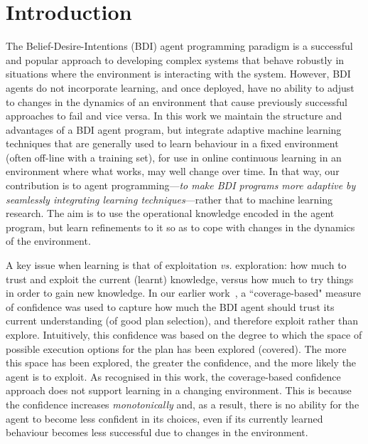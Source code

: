 \section{Introduction}\label{sec:introduction}


The Belief-Desire-Intentions (BDI) agent programming paradigm
\cite{WooldridgeBook,BusettaRHL:AL99-JACK,Pokahr:EXP03-JADEX,jasonbook} is a
successful and popular approach to developing complex systems that
behave robustly in situations where the environment is
interacting with the system.
However, BDI agents do not incorporate learning, and once deployed,
have no ability to adjust to changes in the dynamics of an environment
that cause previously successful approaches to fail and vice versa.
In this work we maintain the structure and advantages of a BDI agent
program, but integrate adaptive machine
learning techniques that are generally used to learn behaviour in a
fixed environment (often off-line with a training set),
for use in online continuous learning in an environment where what
works, may well change over time.
In that way, our contribution is to agent programming---\emph{to make BDI programs more adaptive by seamlessly integrating learning techniques}---rather that to machine learning research.
The aim is to use the operational knowledge encoded in the agent program, but learn refinements to it so as to cope with changes in the dynamics of the environment. 

A key issue when learning is that of exploitation \emph{vs.} exploration: how much to trust and exploit the current
(learnt) knowledge, versus how much to try things in order to gain new
knowledge. 
In our earlier work~\cite{singh10:extending,singh10:learning}, a
``coverage-based" measure of confidence was used to capture how much
the BDI agent should trust its current understanding (of good plan
selection), and therefore exploit rather than explore. Intuitively,
this confidence was based on the degree to which the space of possible
execution options for the plan has been explored (covered).
The more this space has been explored, the
greater the confidence, and the more likely the agent is
to exploit.   
%
As recognised in this work, the coverage-based
confidence approach does not support learning in a changing
environment. This is because the confidence increases
\emph{monotonically} and, as a result, there is no ability for the
agent to become less confident in its choices, even if its currently
learned behaviour becomes less successful due to changes in the
environment. 

